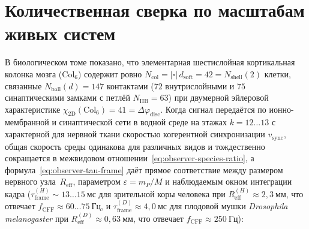 \section{Количественная сверка по масштабам живых систем}
\label{sec:observer-species-table}

В биологическом томе показано, что элементарная шестислойная кортикальная колонка мозга ($\mathrm{Col}_6$) содержит ровно $N_{\mathrm{col}} = |\square|\,d_{\mathrm{soft}} = 42 = N_{\mathrm{shell}}(2)$ клетки, связанные $N_{\mathrm{ball}}(d) = 147$ контактами ($72$ внутрислойными и $75$ синаптическими замками с петлёй $N_{\mathrm{HB}} = 63$) при двумерной эйлеровой характеристике $\chi_{\mathrm{2D}}(\mathrm{Col}_6) = 41 = \Delta\varphi_{\mathrm{disc}}$.
Когда сигнал передаётся по ионно-мембранной и синаптической сети в водной среде на этажах $k=12\ldots 13$ с характерной для нервной ткани скоростью когерентной синхронизации $v_{\mathrm{sync}}$, общая скорость среды одинакова для различных видов и тождественно сокращается в межвидовом отношении~\eqref{eq:observer-species-ratio}, а формула~\eqref{eq:observer-tau-frame} даёт прямое соответствие между размером нервного узла~$R_{\mathrm{eff}}$, параметром $\varepsilon = m_P/M$ и наблюдаемым окном интеграции кадра ($\tau_{\mathrm{frame}}^{(H)} \sim 13\ldots 15\ \mathrm{мс}$ для зрительной коры человека при $R_{\mathrm{eff}}^{(H)} \approx 2{,}3\ \mathrm{мм}$, что отвечает $f_{\mathrm{CFF}} \approx 60\ldots 75\ \mathrm{Гц}$, и $\tau_{\mathrm{frame}}^{(D)} \approx 4{,}0\ \mathrm{мс}$ для плодовой мушки \emph{Drosophila melanogaster} при $R_{\mathrm{eff}}^{(D)} \approx 0{,}63\ \mathrm{мм}$, что отвечает $f_{\mathrm{CFF}} \approx 250\ \mathrm{Гц}$):


